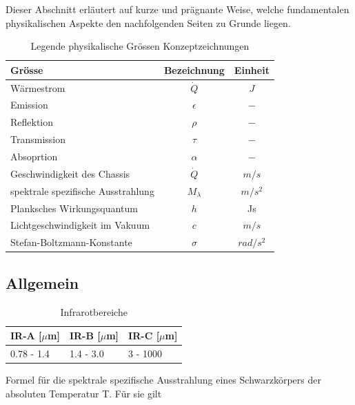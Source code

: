 Dieser Abschnitt erläutert auf kurze und prägnante Weise, welche fundamentalen physikalischen Aspekte den nachfolgenden Seiten zu Grunde liegen. 



\begin{table}[H]
	\begin{tabular}{l|c|c}
		
		\rowcolor{gray} Grösse &  Bezeichnung  & Einheit \\
		\hline 
		Wärmestrom &  $\dot{Q}$ & $J$  \\ 
		\rowcolor{gray}Emission & $\epsilon$ & $-$\\	
		Reflektion &  $\rho $ & $-$ \\
		\rowcolor{gray} Transmission & $\tau$ & $-$\\
		Absoprtion &  $\alpha$ & $-$  \\ 
		
		\rowcolor{gray}Geschwindigkeit des Chassis & $\dot{Q}$ & $m/s$\\
		spektrale spezifische Ausstrahlung &  $M_{\lambda }$ & $m/s^2$ \\
		\rowcolor{gray} Planksches Wirkungsquantum &  $ h$ & Js \\ 
		Lichtgeschwindigkeit im Vakuum & $c $ & $ m/s$ \\ 
		\rowcolor{gray} Stefan-Boltzmann-Konstante & $\sigma$ & $ rad/s^2 $ \\ 
	\end{tabular}
	\caption{Legende physikalische Grössen Konzeptzeichnungen}
	\label{tab:Legende Physikalische Grössen} 
\end{table} 


\subsection{Allgemein}



\begin{table}[]
	\centering
	\label{my-label}
	\begin{tabular}{|l|l|l|}
		\hline
		\rowcolor{gray} IR-A {[}$\mu$m{]} & IR-B {[}$\mu$m{]} & IR-C {[}$\mu$m{]} \\ \hline
		0.78 - 1.4  & 1.4 - 3.0   & 3 - 1000    \\ \hline
	\end{tabular}
	\caption{Infrarotbereiche}
\end{table}


Formel für die spektrale spezifische Ausstrahlung  eines Schwarzkörpers der absoluten Temperatur  T. Für sie gilt

